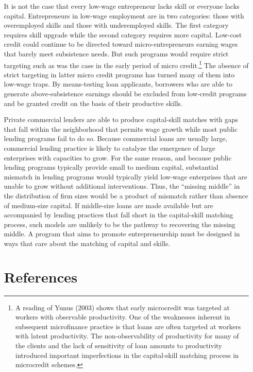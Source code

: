 \documentclass[
  a4paper,
  DIV=11,
  numbers=noendperiod]{scrartcl}
\begin{document}
It is not the case that every low-wage entrepreneur lacks skill or
everyone lacks capital. Entrepreneurs in low-wage employment are in two
categories: those with overemployed skills and those with underemployed
skills. The first category requires skill upgrade while the second
category requires more capital. Low-cost credit could continue to be
directed toward micro-entrepreneurs earning wages that barely meet
subsistence needs. But such programs would require strict targeting such
as was the case in the early period of micro credit.\footnote{A reading
  of Yunus (2003) shows that early microcredit was targeted at workers
  with observable productivity. One of the weaknesses inherent in
  subsequent microfinance practice is that loans are often targeted at
  workers with latent productivity. The non‐observability of
  productivity for many of the clients and the lack of sensitivity of
  loan amounts to productivity introduced important imperfections in the
  capital‐skill matching process in microcredit schemes.} The absence of
strict targeting in latter micro credit programs has turned many of them
into low-wage traps. By means-testing loan applicants, borrowers who are
able to generate above-subsistence earnings should be excluded from
low-credit programs and be granted credit on the basis of their
productive skills.

Private commercial lenders are able to produce capital-skill matches
with gaps that fall within the neighborhood that permits wage growth
while most public lending programs fail to do so. Because commercial
loans are usually large, commercial lending practice is likely to
catalyze the emergence of large enterprises with capacities to grow. For
the same reason, and because public lending programs typically provide
small to medium capital, substantial mismatch in lending programs would
typically yield low-wage enterprises that are unable to grow without
additional interventions. Thus, the ``missing middle'' in the
distribution of firm sizes would be a product of mismatch rather than
absence of medium-size capital. If middle-size loans are made available
but are accompanied by lending practices that fall short in the
capital-skill matching process, such models are unlikely to be the
pathway to recovering the missing middle. A program that aims to promote
entrepreneurship must be designed in ways that care about the matching
of capital and skills.

\newpage{}

\hypertarget{references}{%
\section*{References}\label{references}}
\end{document}
